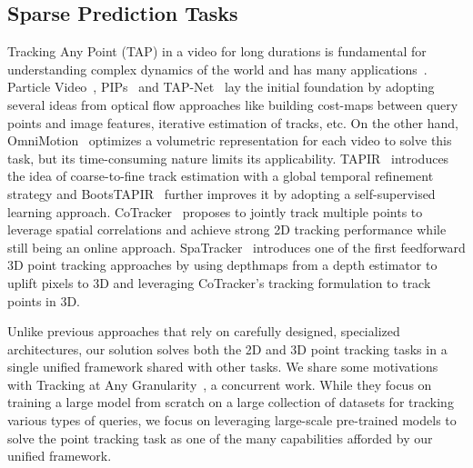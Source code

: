 \subsection{Sparse Prediction Tasks}
Tracking Any Point (TAP) in a video for long durations is fundamental for understanding complex dynamics of the world and has many applications~\cite{wen2024anypointtrajectory, bharadhwaj2024track2act,lei2024mosca, wang2023vggsfm,cheng2023segment}.
Particle Video~\cite{harley2022particle}, PIPs~\cite{bian2023contextpips} and TAP-Net~\cite{doersch2022tap} lay the initial foundation by adopting several ideas from optical flow approaches like building cost-maps between query points and image features, iterative estimation of tracks, etc.
On the other hand, OmniMotion~\cite{wang2023omnimotion} optimizes a volumetric representation for each video to solve this task, but its time-consuming nature limits its applicability.
TAPIR~\cite{doersch2023tapir} introduces the idea of coarse-to-fine track estimation with a global temporal refinement strategy and BootsTAPIR~\cite{doersch2024bootstap} further improves it by adopting a self-supervised learning approach.
CoTracker~\cite{karaev2023cotracker} proposes to jointly track multiple points to leverage spatial correlations and achieve strong 2D tracking performance while still being an online approach.
SpaTracker~\cite{spatracker} introduces one of the first feedforward 3D point tracking approaches by using depthmaps from a depth estimator to uplift pixels to 3D and leveraging CoTracker's tracking formulation to track points in 3D.

Unlike previous approaches that rely on carefully designed, specialized architectures, our solution solves both the 2D and 3D point tracking tasks in a single unified framework shared with other tasks. 
We share some motivations with Tracking at Any Granularity~\cite{harley2024tag}, a concurrent work. 
While they focus on training a large model from scratch on a large collection of datasets for tracking various types of queries, we focus on leveraging large-scale pre-trained models to solve the point tracking task as one of the many capabilities afforded by our unified framework.